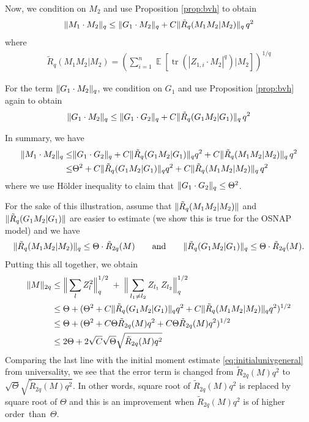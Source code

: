 \documentclass[11pt]{amsart}
\numberwithin{equation}{section}
\numberwithin{equation}{section}
\DeclareMathOperator{\E}{\mathbb{E}}
\DeclareMathOperator*{\tr}{tr}
\DeclarePairedDelimiter{\norm}{\lVert}{\rVert}
\begin{document}
Now, we condition on $M_2$ and use Proposition \ref{prop:bvh} to obtain
\begin{align*}
    \norm{M_1 \cdot M_2}_q \le \norm{G_1 \cdot M_2}_q + C\norm{\tilde R_q(M_1M_2|M_2)}_{q}\,q^2
\end{align*}
where
\begin{align*}
    \tilde R_q(M_1M_2|M_2)=\left(\sum_{i=1}^n \E[ \tr(|Z_{1,i} \cdot M_2|^{q})|M_2]\right)^{1/q}
\end{align*}

For the term $\norm{G_1 \cdot M_2}_q$, we condition on $G_1$ and use Proposition \ref{prop:bvh} again to obtain
\begin{align*}
    \norm{G_1 \cdot M_2}_q \le \norm{G_1 \cdot G_2}_q + C\norm{ \tilde R_q(G_1M_2|G_1)}_{q}\,q^2
\end{align*}

In summary, we have
\begin{align*}
    \norm{M_1 \cdot M_2}_q \le &\norm{G_1 \cdot G_2}_q + C\norm{\tilde R_q(G_1M_2|G_1)}_{q}q^2+C\norm{\tilde R_q(M_1M_2|M_2)}_{q}\,q^2
    \\ \le & \Theta^2 + C\norm{\tilde R_q(G_1M_2|G_1)}_{q}q^2+C\norm{\tilde R_q(M_1M_2|M_2)}_{q}\,q^2
\end{align*}
where we use H\"older inequality to claim that $\norm{G_1 \cdot G_2}_q \le \Theta^2$.

For the sake of this illustration, assume that $\norm{\tilde R_{q}(M_1M_2|M_2)}$ and $\norm{\tilde R_q(G_1M_2|G_1)}$ are easier to estimate (we show this is true for the OSNAP model) and we have
\begin{align*}
    \norm{\tilde R_{q}(M_1M_2|M_2)}_{q} \le \Theta \cdot \tilde{R}_{2q}(M)
    \qquad\text{and}\qquad\norm{\tilde R_{q}(G_1M_2|G_1)}_{q} \le \Theta \cdot \tilde{R}_{2q}(M).
\end{align*}
Putting this all together, we obtain
\begin{align}
    \norm{M}_{2q} &\le 
        \Big\lVert\sum_{l} Z_l^{2}\Big\rVert_{q}^{1/2}
\;+\;
    {\Big\lVert\sum_{l_1 \neq l_2} Z_{l_1}\,Z_{l_2}\Big\rVert_{q}^{1/2}}
 \nonumber\\
 &\le \Theta+(\Theta^2+ C\norm{\tilde R_q(G_1M_2|G_1)}_{q}q^2+C\norm{\tilde R_q(M_1M_2|M_2)}_{q}q^2)^{1/2} \nonumber
    \\
    &\le \Theta+(\Theta^2+ C\Theta \tilde{R}_{2q}(M)q^2+C\Theta \tilde{R}_{2q}(M)q^2)^{1/2} \nonumber
    \\ &\le  2\Theta +2\sqrt{C}\sqrt{\Theta}\sqrt{\tilde{R}_{2q}(M)q^2} 
\label{eq:improveduniv}
\end{align}
Comparing the last line with the initial moment estimate \eqref{eq:initialunivgeneral} from universality, we see that the error term is changed from $\tilde{R}_{2q}(M)q^2$ to $\sqrt{\Theta}\sqrt{\tilde{R}_{2q}(M)q^2}$. In other words, square root of $\tilde{R}_{2q}(M)q^2$ is replaced by square root of $\Theta$ and this is an improvement when $\tilde{R}_{2q}(M)q^2$ is of higher order~than~$\Theta$.
\end{document}
